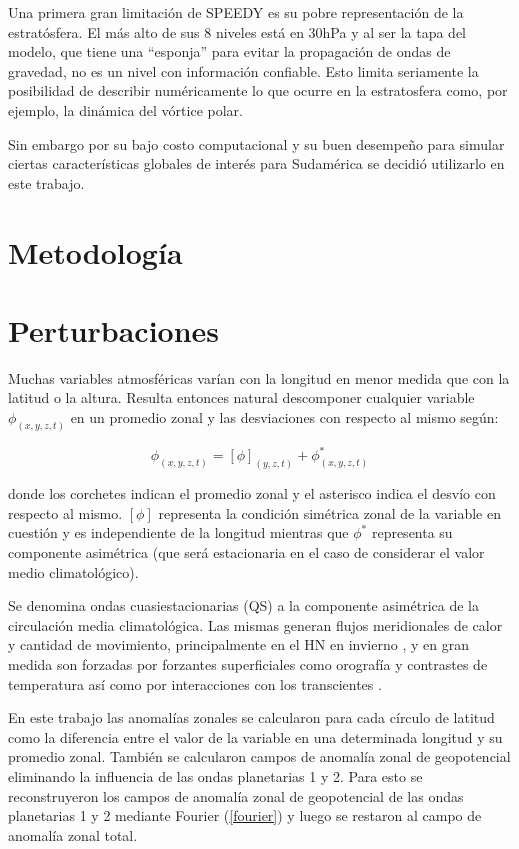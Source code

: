 \documentclass[spanish,a4paper,12pt,oneside]{book}
\begin{document}
Una primera gran limitación de SPEEDY es su pobre representación de la
estratósfera. El más alto de sus 8 niveles está en 30hPa y al ser la
tapa del modelo, que tiene una ``esponja'' para evitar la propagación de
ondas de gravedad, no es un nivel con información confiable. Esto limita
seriamente la posibilidad de describir numéricamente lo que ocurre en la
estratosfera como, por ejemplo, la dinámica del vórtice polar.

Sin embargo por su bajo costo computacional y su buen desempeño para
simular ciertas características globales de interés para Sudamérica
\citep{Barreiro2014} se decidió utilizarlo en este trabajo.

\hypertarget{metodologia}{%
\section{Metodología}\label{metodologia}}

\section*{Perturbaciones}

Muchas variables atmosféricas varían con la longitud en menor medida que
con la latitud o la altura. Resulta entonces natural descomponer
cualquier variable \(\phi_{(x, y, z, t)}\) en un promedio zonal y las
desviaciones con respecto al mismo según:

\[
\phi_{(x, y, z, t)} = [\phi]_{(y, z, t)} + \phi_{(x, y, z, t)}^*
\]

donde los corchetes indican el promedio zonal y el asterisco indica el
desvío con respecto al mismo. \([\phi]\) representa la condición
simétrica zonal de la variable en cuestión y es independiente de la
longitud mientras que \(\phi^*\) representa su componente asimétrica
(que será estacionaria en el caso de considerar el valor medio
climatológico).

Se denomina ondas cuasiestacionarias (QS) a la componente asimétrica de
la circulación media climatológica. Las mismas generan flujos
meridionales de calor y cantidad de movimiento, principalmente en el HN
en invierno \citep{James}, y en gran medida son forzadas por forzantes
superficiales como orografía y contrastes de temperatura así como por
interacciones con los transcientes \citep{Rao2004}.

En este trabajo las anomalías zonales se calcularon para cada círculo de
latitud como la diferencia entre el valor de la variable en una
determinada longitud y su promedio zonal. También se calcularon campos
de anomalía zonal de geopotencial eliminando la influencia de las ondas
planetarias 1 y 2. Para esto se reconstruyeron los campos de anomalía
zonal de geopotencial de las ondas planetarias 1 y 2 mediante Fourier
(\autoref{fourier}) y luego se restaron al campo de anomalía zonal
total.
\end{document}
